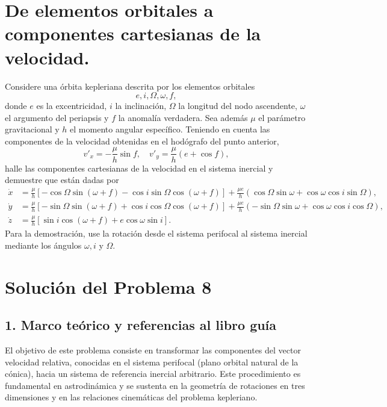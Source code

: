 \documentclass[12pt, a4paper]{article}
\begin{document}
\section{De elementos orbitales a componentes cartesianas de la velocidad.} Considere una órbita kepleriana descrita por los elementos orbitales
$$e, i, \Omega, \omega, f,$$
donde $e$ es la excentricidad, $i$ la inclinación, $\Omega$ la longitud del nodo ascendente, $\omega$ el argumento del periapsis y $f$ la anomalía verdadera. Sea además $\mu$ el parámetro gravitacional y $h$ el momento angular específico. Teniendo en cuenta las componentes de la velocidad obtenidas en el hodógrafo del punto anterior,
$$v'_x = -\frac{\mu}{h} \sin f, \quad v'_y = \frac{\mu}{h} (e + \cos f),$$
halle las componentes cartesianas de la velocidad en el sistema inercial y demuestre que están dadas por
\begin{align*}
\dot{x} &= \frac{\mu}{h} \left[ -\cos\Omega \sin(\omega + f) - \cos i \sin\Omega \cos(\omega + f) \right] + \frac{\mu e}{h} (\cos\Omega \sin \omega + \cos\omega \cos i \sin\Omega), \\
\dot{y} &= \frac{\mu}{h} \left[ -\sin\Omega \sin(\omega + f) + \cos i \cos\Omega \cos(\omega + f) \right] + \frac{\mu e}{h} (-\sin\Omega \sin \omega + \cos\omega \cos i \cos\Omega), \\
\dot{z} &= \frac{\mu}{h} \left[ \sin i \cos(\omega + f) + e \cos\omega \sin i \right].
\end{align*}
Para la demostración, use la rotación desde el sistema perifocal al sistema inercial mediante los ángulos $\omega, i$ y $\Omega$.



\section*{Solución del Problema 8}

\subsection*{1. Marco teórico y referencias al libro guía}
El objetivo de este problema consiste en transformar las componentes del vector velocidad relativa, conocidas en el sistema perifocal (plano orbital natural de la cónica), hacia un sistema de referencia inercial arbitrario. Este procedimiento es fundamental en astrodinámica y se sustenta en la geometría de rotaciones en tres dimensiones y en las relaciones cinemáticas del problema kepleriano.
\end{document}
